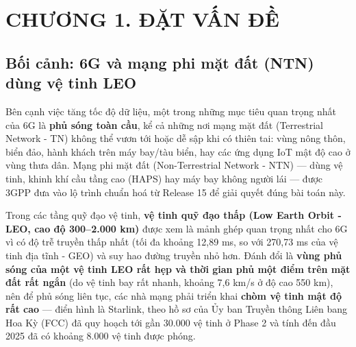 \documentclass{article} %
\begin{document}
\tableofcontents
\thispagestyle{empty}
\cleardoublepage
{\let\oldnumberline\numberline
\renewcommand{\numberline}{Hình~\oldnumberline}
\listoffigures}
\newpage
{}
\newpage
{\let\oldnumberline\numberline
\renewcommand{\numberline}{Bảng~\oldnumberline}
\listoftables}
\newpage

\section*{CHƯƠNG 1. ĐẶT VẤN ĐỀ}
\setcounter{section}{1}
\setcounter{subsection}{0}
\setcounter{figure}{0}
\setcounter{table}{0}

\subsection{Bối cảnh: 6G và mạng phi mặt đất (NTN) dùng vệ tinh LEO}
Bên cạnh việc tăng tốc độ dữ liệu, một trong những mục tiêu quan trọng nhất của 6G là \textbf{phủ sóng toàn cầu}, kể cả những nơi mạng mặt đất (Terrestrial Network - TN) không thể vươn tới hoặc dễ sập khi có thiên tai: vùng nông thôn, biển đảo, hành khách trên máy bay/tàu biển, hay các ứng dụng IoT mật độ cao ở vùng thưa dân. Mạng phi mặt đất (Non-Terrestrial Network - NTN) — dùng vệ tinh, khinh khí cầu tầng cao (HAPS) hay máy bay không người lái — được 3GPP đưa vào lộ trình chuẩn hoá từ Release 15 để giải quyết đúng bài toán này.

Trong các tầng quỹ đạo vệ tinh, \textbf{vệ tinh quỹ đạo thấp (Low Earth Orbit - LEO, cao độ 300--2.000 km)} được xem là mảnh ghép quan trọng nhất cho 6G vì có độ trễ truyền thấp nhất (tối đa khoảng 12,89 ms, so với 270,73 ms của vệ tinh địa tĩnh - GEO) và suy hao đường truyền nhỏ hơn. Đánh đổi là \textbf{vùng phủ sóng của một vệ tinh LEO rất hẹp và thời gian phủ một điểm trên mặt đất rất ngắn} (do vệ tinh bay rất nhanh, khoảng 7,6 km/s ở độ cao 550 km), nên để phủ sóng liên tục, các nhà mạng phải triển khai \textbf{chòm vệ tinh mật độ rất cao} — điển hình là Starlink, theo hồ sơ của Ủy ban Truyền thông Liên bang Hoa Kỳ (FCC) đã quy hoạch tới gần 30.000 vệ tinh ở Phase 2 và tính đến đầu 2025 đã có khoảng 8.000 vệ tinh được phóng.
\end{document}
